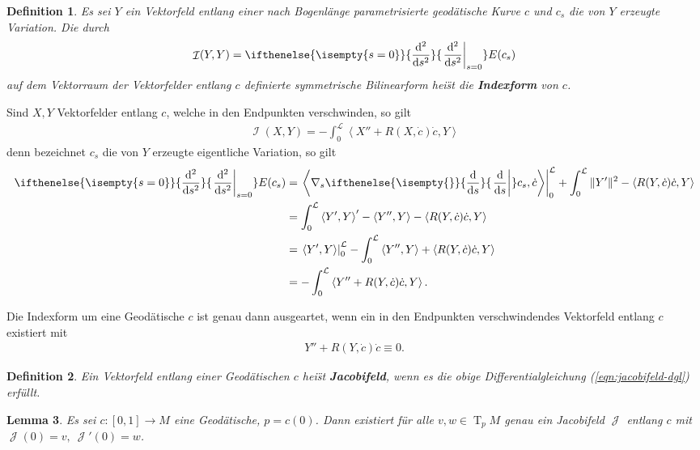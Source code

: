 \documentclass[paper=A4, twoside, chapterprefix=true, bibliography=totoc, headsepline]{scrbook}
\DeclareMathOperator{\calI}{\mathcal{I}}
\DeclareMathOperator{\calJ}{\mathcal{J}}
\DeclareMathOperator{\T}{T}         %
\newcommand{\dop}{\mathrm{d}}
\newcommand{\difffrac}[3][]{\ifthenelse{\isempty{#1}}{\frac{\dop #2}{\dop #3}}{\left. \frac{\dop #2}{\dop #3} \right|_{#1}}}
\theoremstyle{plain}
\newtheorem{Dfn}{Definition}[chapter]
\newtheorem{Lemma}[Dfn]{Lemma}
\theoremstyle{nonumberplain}
\theoremstyle{empty}
\theoremstyle{break}
\newcommand{\CmIndex}[2][]{\ifthenelse{\isempty{#1}}{\index{#2}}{\index{#1}}#2}
\newcommand{\CmMark}[2][]{\textbf{\CmIndex[#1]{#2}}}
\begin{document}
\begin{Dfn}
  Es sei $Y$ ein Vektorfeld entlang einer nach Bogenl\"ange parametrisierte geod\"atische Kurve $c$ und $c_s$ die von $Y$ erzeugte Variation. Die durch
  \begin{align*}
    \calI(Y,Y) = \difffrac[s=0]{^2}{s^2} E(c_s)
  \end{align*}
  auf dem Vektorraum der Vektorfelder entlang $c$ definierte symmetrische Bilinearform hei\"st die \CmMark{Indexform} von $c$.
\end{Dfn}

Sind $X,Y$ Vektorfelder entlang $c$, welche in den Endpunkten
verschwinden, so gilt
\begin{align*}
  \calI(X,Y) = -\int_0^{\mathcal L}\left<X'' + R(X,\dot c)\dot
    c,Y\right>
\end{align*}
denn bezeichnet $c_s$ die von $Y$ erzeugte eigentliche Variation, so
gilt
\begin{align*}
  \difffrac[s=0]{^2}{s^2}E(c_s) & = \left.\left<\nabla_s\difffrac{}{s}c_s,\dot c\right>\right|_0^{\mathcal L} + \int_0^{\mathcal L}\|Y'\|^2 - \left<R(Y,\dot c)\dot c,Y\right>\\
  & = \int_0^{\mathcal L}\left<Y',Y\right>' - \left<Y'',Y\right> - \left<R(Y,\dot c)\dot c,Y\right>\\
  & = \left.\left<Y',Y\right>\right|_0^{\mathcal L} - \int_0^{\mathcal L} \left<Y'',Y\right> + \left<R(Y,\dot c)\dot c,Y\right>\\
  & = - \int_0^{\mathcal L}\left<Y'' + R(Y,\dot c) \dot c, Y\right>.
\end{align*}

Die Indexform um eine Geod\"atische $c$ ist genau dann ausgeartet, wenn ein in den Endpunkten verschwindendes Vektorfeld entlang $c$ existiert mit
\begin{align}
  Y'' + R(Y,\dot c) \dot c \equiv 0.\label{eqn:jacobifeld-dgl}
\end{align}

\begin{Dfn}
  Ein Vektorfeld entlang einer Geod\"atischen $c$ hei\"st \CmMark{Jacobifeld}, wenn es die obige Differentialgleichung (\ref{eqn:jacobifeld-dgl}) erf\"ullt.
\end{Dfn}

\begin{Lemma}\label{thm:lemma-9-4}
  Es sei $c \colon [0,1] \to M$ eine Geod\"atische, $p = c(0)$.
  Dann existiert f\"ur alle $v,w \in \T_pM$ genau ein Jacobifeld $\calJ$ entlang $c$ mit $\calJ(0) = v, \ \calJ'(0) = w$.
\end{Lemma}
\end{document}
